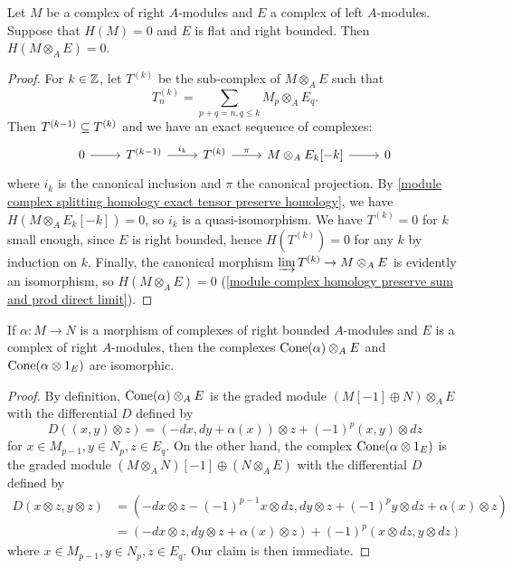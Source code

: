 \begin{lemma}\label{module complex tensor with positive flat preserve exact}
Let $M$ be a complex of right $A$-modules and $E$ a complex of left $A$-modules. Suppose that $H(M)=0$ and $E$ is flat and right bounded. Then $H(M\otimes_AE)=0$.
\end{lemma}
\begin{proof}
For $k\in\mathbb{Z}$, let $T^{(k)}$ be the sub-complex of $M\otimes_AE$ such that
\[T_n^{(k)}=\sum_{p+q=n,q\leq k}M_p\otimes_AE_q.\]
Then $T^{(k-1)}\subseteq T^{(k)}$ and we have an exact sequence of complexes:
\[\begin{tikzcd}
0\ar[r]&T^{(k-1)}\ar[r,"i_k"]&T^{(k)}\ar[r,"\pi"]&M\otimes_AE_k[-k]\ar[r]&0
\end{tikzcd}\]
where $i_k$ is the canonical inclusion and $\pi$ the canonical projection. By \cref{module complex splitting homology exact tensor preserve homology}, we have $H(M\otimes_AE_k[-k])=0$, so $i_k$ is a quasi-isomorphism. We have $T^{(k)}=0$ for $k$ small enough, since $E$ is right bounded, hence $H(T^{(k)})=0$ for any $k$ by induction on $k$. Finally, the canonical morphism $\varinjlim T^{(k)}\to M\otimes_AE$ is evidently an isomorphism, so $H(M\otimes_AE)=0$ (\cref{module complex homology preserve sum and prod direct limit}).
\end{proof}
\begin{lemma}\label{module complex tensor with positive flat preserve cone}
If $\alpha:M\to N$ is a morphism of complexes of right bounded $A$-modules and $E$ is a complex of right $A$-modules, then the complexes $\mathrm{Cone}(\alpha)\otimes_AE$ and $\mathrm{Cone}(\alpha\otimes 1_E)$ are isomorphic.
\end{lemma}
\begin{proof}
By definition, $\mathrm{Cone}(\alpha)\otimes_AE$ is the graded module $(M[-1]\oplus N)\otimes_AE$ with the differential $D$ defined by
\[D((x,y)\otimes z)=(-dx,dy+\alpha(x))\otimes z+(-1)^p(x,y)\otimes dz\]
for $x\in M_{p-1},y\in N_p,z\in E_q$. On the other hand, the complex $\mathrm{Cone}(\alpha\otimes 1_E)$ is the graded module $(M\otimes_AN)[-1]\oplus(N\otimes_AE)$ with the differential $D$ defined by
\begin{align*}
D(x\otimes z,y\otimes z)&=(-dx\otimes z-(-1)^{p-1}x\otimes dz,dy\otimes z+(-1)^py\otimes dz+\alpha(x)\otimes z)\\
&=(-dx\otimes z,dy\otimes z+\alpha(x)\otimes z)+(-1)^p(x\otimes dz,y\otimes dz)
\end{align*}
where $x\in M_{p-1},y\in N_p,z\in E_q$. Our claim is then immediate.
\end{proof}
